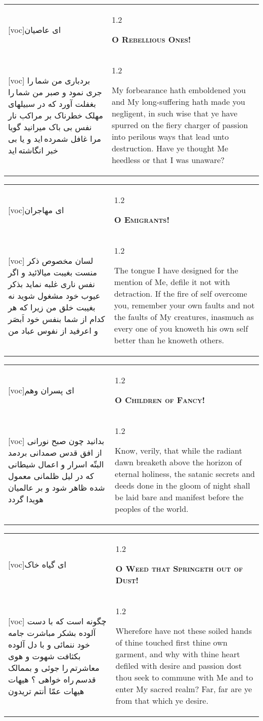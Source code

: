 \documentclass[11pt]{article}
\makeatletter
\newenvironment{orig}
  {\begin{farsi}[voc]}
  {\end{farsi}}
\newenvironment{trans}
  {\Large\begin{spacing}{1.2}\raggedright}
  {\end{spacing}}
\newenvironment{word}
  {\begin{tabular}[t]{p{2.75in}@{\hspace{3em}}p{2.75in}}}
  {\end{tabular}}
\newcommand{\ayat}[2]{\begin{orig}#1\end{orig} & \begin{trans}#2\end{trans}}
\newcommand{\heading}[2]{\textsc{\textbf{#1}} %
}
\makeatother
\begin{document}
\pagebreak

\begin{word}
\ayat{ای عاصيان}{\heading{O Rebellious Ones!}{}} \\ \ayat{
بردباری من شما را جری نمود و صبر من شما را بغفلت آورد که در سبيلهای مهلک خطرناک بر مراکب نار نفس بی باک ميرانيد گويا مرا غافل شمرده ايد و يا بی خبر انگاشته ايد
}{
  My forbearance hath emboldened you and My long-suffering hath made you
  negligent, in such wise that ye have spurred on the fiery charger of passion
  into perilous ways that lead unto destruction. Have ye thought Me heedless
  or that I was unaware?
}
\end{word}

\pagebreak

\begin{word}
\ayat{ای مهاجران}{\heading{O Emigrants!}{}} \\ \ayat{
لسان مخصوص ذکر منست بغيبت ميالائيد و اگر نفس ناری غلبه نمايد بذکر عيوب خود مشغول شويد نه بغيبت خلق من زيرا که هر کدام از شما بنفس خود اَبصَر و اعرفيد از نفوس عباد من
}{
  The tongue I have designed for the mention of Me, defile it not with
  detraction. If the fire of self overcome you, remember your own faults and
  not the faults of My creatures, inasmuch as every one of you knoweth his own
  self better than he knoweth others.
}
\end{word}

\pagebreak

\begin{word}
\ayat{ای پسران وهم}{\heading{O Children of Fancy!}{}} \\ \ayat{
بدانيد چون صبح نورانی از افق قدس صمدانی بردمد البتّه اسرار و اعمال شيطانی که در ليل ظلمانی معمول شده ظاهر شود و بر عالميان هويدا گردد
}{
  Know, verily, that while the radiant dawn breaketh above the horizon of
  eternal holiness, the satanic secrets and deeds done in the gloom of night
  shall be laid bare and manifest before the peoples of the world.
}
\end{word}

\pagebreak

\begin{word}
\ayat{ای گياه خاک}{\heading{O Weed that Springeth out of Dust!}{}} \\ \ayat{
چگونه است که با دست آلوده بشکر مباشرت جامه خود ننمائی و با دل آلوده بکثافت شهوت و هوی معاشرتم را جوئی و بممالک قدسم راه خواهی ؟ هيهات هيهات عمّا أنتم تريدون
}{
  Wherefore have not these soiled hands of thine touched first thine own
  garment, and why with thine heart defiled with desire and passion dost thou
  seek to commune with Me and to enter My sacred realm? Far, far are ye from
  that which ye desire.
}
\end{word}
\end{document}
